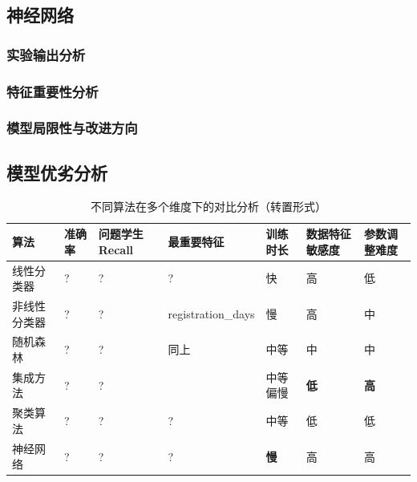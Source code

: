 \documentclass{SYSUReport}
\begin{document}
\subsection{神经网络}
\subsubsection{实验输出分析}
\subsubsection{特征重要性分析}
\subsubsection{模型局限性与改进方向}





\subsection{模型优劣分析}
\begin{landscape}
\begin{table}[h]
\centering
\caption{不同算法在多个维度下的对比分析（转置形式）}
\renewcommand{\arraystretch}{1.3}
\begin{tabular}{>{\raggedright\arraybackslash}p{3.5cm} 
                >{\centering\arraybackslash}p{2cm}
                >{\centering\arraybackslash}p{2.5cm}
                >{\centering\arraybackslash}p{2cm}
                >{\centering\arraybackslash}p{3.2cm}
                >{\centering\arraybackslash}p{2.2cm}
                >{\centering\arraybackslash}p{2cm}}
\toprule
算法 & 准确率 & 问题学生Recall & 最重要特征 & 训练时长 & 数据特征敏感度 & 参数调整难度 \\
\midrule

线性分类器 &
? &
? &
? &
快 &
高 &
低 \\

非线性分类器 &
? &
? &
registration\_days &
慢 &
高 &
中 \\

随机森林 &
? &
? &
同上 &
中等 &
中 &
中 \\

集成方法 &
? &
? &
 &
中等偏慢 &
\textbf{低} &
\textbf{高} \\

聚类算法 &
? &
? &
? &
中等 &
低 &
低 \\

神经网络 &
? &
? &
? &
\textbf{慢} &
高 &
高 \\
\bottomrule
\end{tabular}
\label{tab:algorithm_comparison_rotated}
\end{table}
\end{landscape}






\newpage


\end{document}
